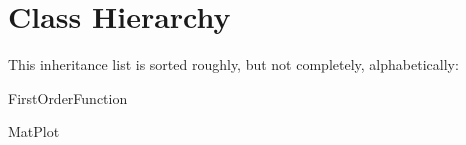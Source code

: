 \section{Class Hierarchy}
This inheritance list is sorted roughly, but not completely, alphabetically\+:\begin{DoxyCompactList}
\item First\+Order\+Function\begin{DoxyCompactList}
\item {}
\end{DoxyCompactList}
\item {}
\item {}
\begin{DoxyCompactList}
\item {}
\end{DoxyCompactList}
\item Mat\+Plot\begin{DoxyCompactList}
\item {}
\end{DoxyCompactList}
\end{DoxyCompactList}
